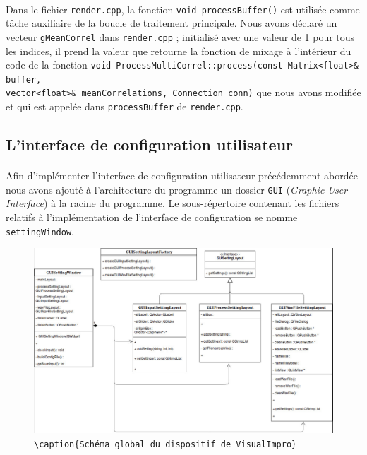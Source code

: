 \paragraph{}
Dans le fichier \verb!render.cpp!, la fonction
\verb!void processBuffer()! est utilisée comme tâche auxiliaire de la
boucle de traitement principale. Nous avons déclaré un vecteur
\verb!gMeanCorrel! dans \verb!render.cpp! ; initialisé avec une valeur
de 1 pour tous les indices, il prend la valeur que retourne la
fonction de mixage à l'intérieur du code de la fonction
\verb!void ProcessMultiCorrel::process(const Matrix<float>& buffer,! \\ \verb!vector<float>& meanCorrelations, Connection conn)!
que nous avons modifiée et qui est appelée dans \verb!processBuffer!
de \verb!render.cpp!.

\subsection{L'interface de configuration utilisateur}
\paragraph{}
Afin d'implémenter l'interface de configuration utilisateur précédemment abordée
nous avons ajouté à l'architecture du programme un dossier
\verb!GUI! (\textit{Graphic User Interface}) à la racine du programme.
Le sous-répertoire contenant les fichiers relatifs à l'implémentation de
l'interface de configuration se nomme \verb!settingWindow!.

\begin{figure}[h]
 \centering
 \includegraphics[scale=0.5]{umlSettingWindow.png}
 \verb!\caption{Schéma global du dispositif de VisualImpro}!
 \label{schéma global}
\end{figure}

